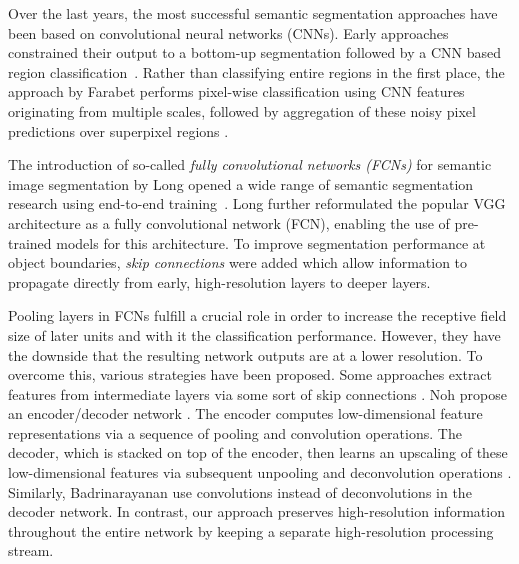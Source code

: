 \documentclass[10pt,twocolumn,letterpaper]{article}
\newcommand{\PAR}[1]{\vskip4pt \noindent {\bf #1~}}
\begin{document}
\PAR{Semantic Segmentation Approaches.}
Over the last years, the most successful semantic segmentation approaches have been based on convolutional neural networks (CNNs).
Early approaches constrained their output to a bottom-up segmentation followed by a CNN based region classification~\cite{yan15CVPR}.
Rather than classifying entire regions in the first place, the approach by Farabet \etal performs pixel-wise classification using CNN features originating from multiple scales, followed by aggregation of these noisy pixel predictions over superpixel regions \cite{Farabet13TPAMI}.

The introduction of so-called \emph{fully convolutional networks (FCNs)} for semantic image segmentation by Long \etal \cite{Long15CVPR} opened a wide range of semantic segmentation research using end-to-end training~\cite{Dai2015CVPR}.
%
Long \etal further reformulated the popular VGG architecture \cite{Simonyan15ICLR} as a fully convolutional network (FCN), enabling the use of pre-trained models for this architecture.
To improve segmentation performance at object boundaries, \emph{skip connections} were added which allow information to propagate directly from early, high-resolution layers to deeper layers.

Pooling layers in FCNs fulfill a crucial role in order to increase the receptive field size of later units and with it the classification performance. However, they have the downside that the resulting network outputs are at a lower resolution.
To overcome this, various strategies have been proposed.
Some approaches extract features from intermediate layers via some sort of skip connections \cite{Long15CVPR, Chen15ICLR, Liu2015ICLRW, HChen16ARXIV}.
Noh \etal propose an encoder/decoder network \cite{Noh15ICCV}.
The encoder computes low-dimensional feature representations via a sequence of pooling and convolution operations.
The decoder, which is stacked on top of the encoder, then learns an upscaling of these low-dimensional features via subsequent unpooling and deconvolution operations \cite{Zeiler11CVPR}.
Similarly, Badrinarayanan \etal \cite{Badrinarayanan15aARXIV, Badrinarayanan15bARXIV} use convolutions instead of deconvolutions in the decoder network.
In contrast, our approach preserves high-resolution information throughout the entire network by keeping a separate high-resolution processing stream.
\end{document}
